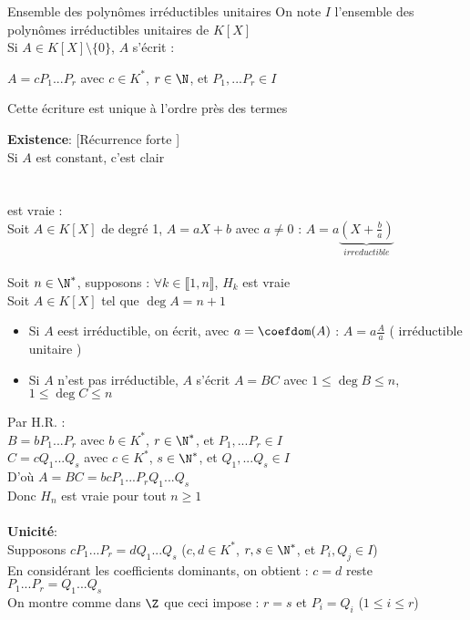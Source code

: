 \documentclass[12pt,a4paper]{report}
\begin{document}
        \begin{theoreme}{Ensemble des polynômes irréductibles unitaires}{}
        On note $I$ l'ensemble des polynômes irréductibles unitaires de $K[X]$\\
        Si $A \in K[X] \setminus \lbrace 0\rbrace$, $A$ s'écrit : 
        \begin{center}
            $A=cP_1 ... P_r$ \: \: \: avec $c\in K^*$, $r\in \N$, et $P_1 ,... P_r \in I$
        \end{center}
        Cette écriture est unique à l'ordre près des termes
        \end{theoreme}
        
        \begin{demo}
        \textbf{Existence}: [Récurrence forte ]\\
        Si $A$ est constant, c'est clair \\
        \\
        \\
         est vraie : \\
        Soit $A \in K[X]$ de degré 1, $A=aX+b$ avec $a\neq0$ : $A=a\underbrace{(X+\frac{b}{a})}_{irreductible}$\\
        \\
        Soit $n \in \N^*$, supposons : $\forall k \in \llbracket1,n\rrbracket$, $H_k$ est vraie \\
        Soit $A\in K[X]$ tel que $\deg A = n+1$
        \begin{itemize}
            \item Si $A$ eest irréductible, on écrit, avec $a=\coefdom (A)$ : $A=a \frac{A}{a}$ ( irréductible unitaire ) 
            \item Si $A$ n'est pas irréductible, $A$ s'écrit $A=BC$ avec $1\leq \deg B \leq n$, $1\leq \deg C \leq n$
        \end{itemize}
        Par H.R. : \\
        $B=bP_1 ... P_r$ avec $b\in K^*$, $r\in \N^*$, et $P_1 ,... P_r \in I$ \\
        $C=cQ_1 ... Q_s$ avec $c\in K^*$, $s\in \N^*$, et $Q_1 ,... Q_s \in I$ \\
        D'où $A=BC= bcP_1 ... P_r Q_1 ... Q_s$ \\
        Donc $H_n$ est vraie pour tout $n\geq 1$ \\
        \\
        \textbf{Unicité}: \\
        Supposons $cP_1 ... P_r=dQ_1 ... Q_s$ ($c,d\in K^*$, $r,s\in \N^*$, et $P_i , Q_j\in I$)\\
        En considérant les coefficients dominants, on obtient : $c=d$ reste $P_1 ... P_r = Q_1 ... Q_s$\\
        On montre comme dans $\Z$ que ceci impose : $r=s$ et $P_i = Q_i$ ($1\leq i \leq r$)
        \end{demo}
        
\end{document}

